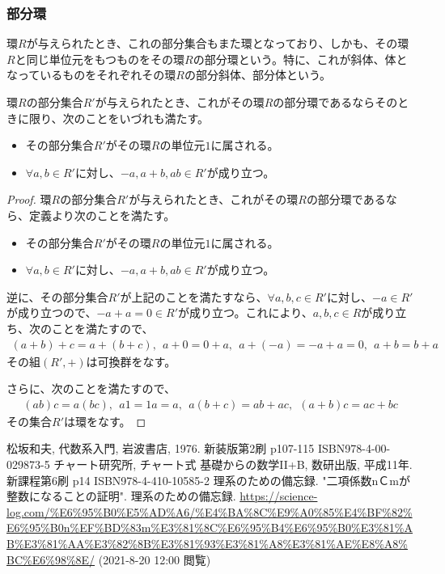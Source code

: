 \documentclass[dvipdfmx]{jsarticle}
\begin{document}
\subsubsection{部分環}%
\begin{dfn}
環$R$が与えられたとき、これの部分集合もまた環となっており、しかも、その環$R$と同じ単位元をもつものをその環$R$の部分環という。特に、これが斜体、体となっているものをそれぞれその環$R$の部分斜体、部分体という。
\end{dfn}
\begin{thm}\label{3.3.1.14}
環$R$の部分集合$R'$が与えられたとき、これがその環$R$の部分環であるならそのときに限り、次のことをいづれも満たす。
\begin{itemize}
\item
  その部分集合$R'$がその環$R$の単位元$1$に属される。
\item
  $\forall a,b \in R'$に対し、$- a,a + b,ab \in R'$が成り立つ。
\end{itemize}
\end{thm}
\begin{proof}
環$R$の部分集合$R'$が与えられたとき、これがその環$R$の部分環であるなら、定義より次のことを満たす。
\begin{itemize}
\item
  その部分集合$R'$がその環$R$の単位元$1$に属される。
\item
  $\forall a,b \in R'$に対し、$- a,a + b,ab \in R'$が成り立つ。
\end{itemize}\par
逆に、その部分集合$R'$が上記のことを満たすなら、$\forall a,b,c \in R'$に対し、$- a \in R'$が成り立つので、$- a + a = 0 \in R'$が成り立つ。これにより、$a,b,c \in R$が成り立ち、次のことを満たすので、
\begin{align*}
(a + b) + c = a + (b + c),\ \ a + 0 = 0 + a,\ \ a + ( - a) = - a + a = 0,\ \ a + b = b + a
\end{align*}
その組$\left( R', + \right)$は可換群をなす。\par
さらに、次のことを満たすので、
\begin{align*}
(ab)c = a(bc),\ \ a1 = 1a = a,\ \ a(b + c) = ab + ac,\ \ (a + b)c = ac + bc
\end{align*}
その集合$R'$は環をなす。
\end{proof}
\begin{thebibliography}{50}
  松坂和夫, 代数系入門, 岩波書店, 1976. 新装版第2刷 p107-115 ISBN978-4-00-029873-5
  チャート研究所, チャート式 基礎からの数学II+B, 数研出版, 平成11年. 新課程第6刷 p14 ISBN978-4-410-10585-2
  理系のための備忘録. "二項係数nＣmが整数になることの証明". 理系のための備忘録. \url{https://science-log.com/%E6%95%B0%E5%AD%A6/%E4%BA%8C%E9%A0%85%E4%BF%82%E6%95%B0n%EF%BD%83m%E3%81%8C%E6%95%B4%E6%95%B0%E3%81%AB%E3%81%AA%E3%82%8B%E3%81%93%E3%81%A8%E3%81%AE%E8%A8%BC%E6%98%8E/} (2021-8-20 12:00 閲覧)
\end{thebibliography}
\end{document}

